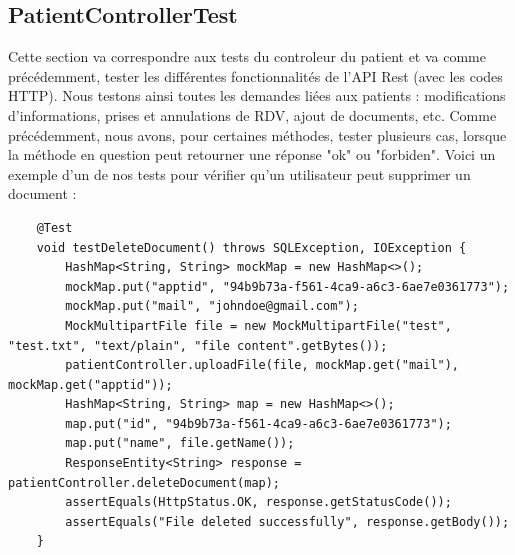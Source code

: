 \documentclass[a4paper]{report}
\begin{document}
\subsection{PatientControllerTest}
Cette section va correspondre aux tests du controleur du patient et va comme précédemment, tester les différentes fonctionnalités de l'API Rest (avec les codes HTTP).
Nous testons ainsi toutes les demandes liées aux patients : modifications d'informations, prises et annulations de RDV, ajout de documents, etc. Comme précédemment, nous avons, pour certaines méthodes,
tester plusieurs cas, lorsque la méthode en question peut retourner une réponse "ok" ou "forbiden".
Voici un exemple d'un de nos tests pour vérifier qu'un utilisateur peut supprimer un document : 
\begin{lstlisting}
    @Test
    void testDeleteDocument() throws SQLException, IOException {
        HashMap<String, String> mockMap = new HashMap<>();
        mockMap.put("apptid", "94b9b73a-f561-4ca9-a6c3-6ae7e0361773");
        mockMap.put("mail", "johndoe@gmail.com");
        MockMultipartFile file = new MockMultipartFile("test", "test.txt", "text/plain", "file content".getBytes());
        patientController.uploadFile(file, mockMap.get("mail"), mockMap.get("apptid"));
        HashMap<String, String> map = new HashMap<>();
        map.put("id", "94b9b73a-f561-4ca9-a6c3-6ae7e0361773");
        map.put("name", file.getName());
        ResponseEntity<String> response = patientController.deleteDocument(map);
        assertEquals(HttpStatus.OK, response.getStatusCode());
        assertEquals("File deleted successfully", response.getBody());
    }
\end{lstlisting}
\end{document}
